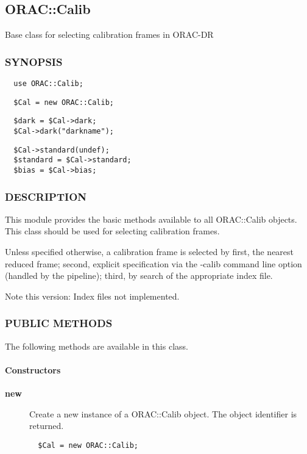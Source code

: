 \subsection{ORAC::Calib\label{ORAC::Calib}}


Base class for selecting calibration frames in ORAC-DR

\subsubsection*{SYNOPSIS\label{ORAC::Calib_SYNOPSIS}}
\begin{verbatim}
  use ORAC::Calib;
\end{verbatim}
\begin{verbatim}
  $Cal = new ORAC::Calib;
\end{verbatim}
\begin{verbatim}
  $dark = $Cal->dark;
  $Cal->dark("darkname");
\end{verbatim}
\begin{verbatim}
  $Cal->standard(undef);
  $standard = $Cal->standard;
  $bias = $Cal->bias;
\end{verbatim}
\subsubsection*{DESCRIPTION\label{ORAC::Calib_DESCRIPTION}}


This module provides the basic methods available to all ORAC::Calib
objects.  This class should be used for selecting calibration frames.



Unless specified otherwise, a calibration frame is selected by first,
the nearest reduced frame; second, explicit specification via the
-calib command line option (handled by the pipeline); third, by search
of the appropriate index file.



Note this version: Index files not implemented.

\subsubsection*{PUBLIC METHODS\label{ORAC::Calib_PUBLIC_METHODS}}


The following methods are available in this class.

\paragraph*{Constructors\label{ORAC::Calib_Constructors}}
\begin{description}

\item[{\textbf{new}}] \mbox{}

Create a new instance of a ORAC::Calib object.
The object identifier is returned.

\begin{verbatim}
  $Cal = new ORAC::Calib;
\end{verbatim}
\end{description}
